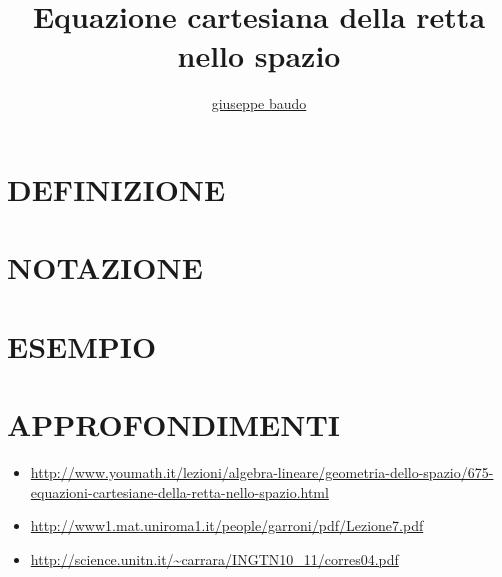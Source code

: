 \documentclass[a4paper,10pt]{article}
\title{Equazione cartesiana della retta nello spazio}
\author{\href{http://www.baudo.hol.es}{giuseppe baudo}}
\begin{document}
\maketitle

\section{DEFINIZIONE}

\section{NOTAZIONE}

\section{ESEMPIO}

\section{APPROFONDIMENTI}
\begin{itemize}
 \item \url{http://www.youmath.it/lezioni/algebra-lineare/geometria-dello-spazio/675-equazioni-cartesiane-della-retta-nello-spazio.html}
 \item \url{http://www1.mat.uniroma1.it/people/garroni/pdf/Lezione7.pdf}
 \item \url{http://science.unitn.it/~carrara/INGTN10_11/corres04.pdf}
\end{itemize}
\end{document}

